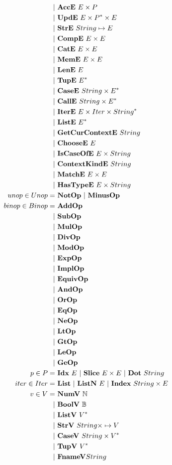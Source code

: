 \begin{align*}
    | & ~ \acce ~ E \times P \\
    | & ~ \upde ~ E \times \seq P \times E \\
    | & ~ \stre ~ String \mapsto E \\
    | & ~ \compe ~ E \times E \\
    | & ~ \cate ~ E \times E \\
    | & ~ \meme ~ E \times E \\
    | & ~ \lene ~ E \\
    | & ~ \tupe ~ \seq E \\
    | & ~ \casee ~ String \times \seq E \\
    | & ~ \calle ~ String \times \seq E \\
    | & ~ \itere ~ E \times Iter \times \seq{String} \\
    | & ~ \liste ~ \seq E \\
    | & ~ \getcurcontexte ~ String \\
    | & ~ \choosee ~ E \\
    | & ~ \iscaseofe ~ E \times String \\
    | & ~ \contextkinde ~ String \\
    | & ~ \matche ~ E \times E \\
    | & ~ \hastypee ~ E \times String \\
%
  unop \in Unop =& ~ \notop ~ | ~ \minusop \\
  binop \in Binop =& ~ \addop \\
    | & ~ \subop \\
    | & ~ \mulop \\
    | & ~ \divop \\
    | & ~ \modop \\
    | & ~ \expop \\
    | & ~ \implop \\
    | & ~ \equivop \\
    | & ~ \andop \\
    | & ~ \orop \\
    | & ~ \eqop \\
    | & ~ \neop \\
    | & ~ \ltop \\
    | & ~ \gtop \\
    | & ~ \leop \\
    | & ~ \geop \\
%
  p \in P =& ~ \idxp ~ E ~ | ~ \slicep ~ E \times E ~ | ~ \dotp ~ String \\
%
  iter \in Iter =& ~ \listiter ~ | ~ \listniter ~ E ~|~ \listidxiter ~ String \times E \\
%
  v \in V =& ~ \numv ~ \mathbb N \\
    | & ~ \boolv ~ \mathbb B \\
    | & ~ \listv ~ \seq V \\
    | & ~ \strv ~ String \times \mapsto V \\
    | & ~ \casev ~ String \times \seq V \\
    | & ~ \tupv ~ \seq V \\
    | & ~ \fnamev String \\
\end{align*}



